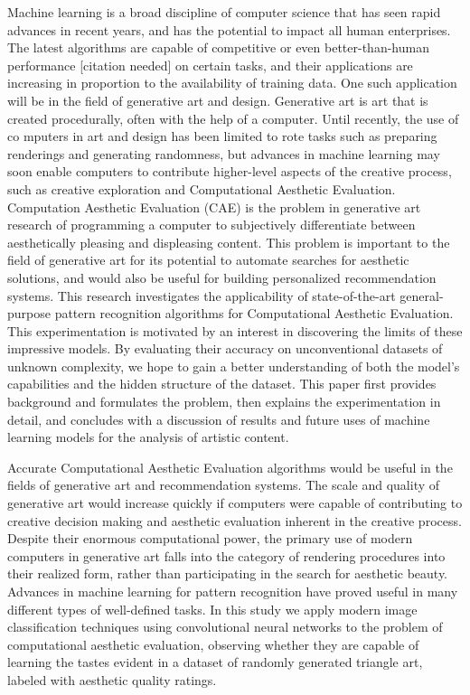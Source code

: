 \documentclass[midd]{thesis}
\begin{document}
Machine learning is a broad discipline of computer science that has seen rapid advances in recent years, and has the potential to impact all human enterprises. The latest algorithms are capable of competitive or even better-than-human performance [citation needed] on certain tasks, and their applications are increasing in proportion to the availability of training data. One such application will be in the field of generative art and design. Generative art is art that is created procedurally, often with the help of a computer. Until recently, the use of co mputers in art and design has been limited to rote tasks such as preparing renderings and generating randomness, but advances in machine learning may soon enable computers to contribute higher-level aspects of the creative process, such as creative exploration and Computational Aesthetic Evaluation. Computation Aesthetic Evaluation (CAE) is the problem in generative art research of programming a computer to subjectively differentiate between aesthetically pleasing and displeasing content. This problem is important to the field of generative art for its potential to automate searches for aesthetic solutions, and would also be useful for building personalized recommendation systems. This research investigates the applicability of state-of-the-art general-purpose pattern recognition algorithms for Computational Aesthetic Evaluation. This experimentation is motivated by an interest in discovering the limits of these impressive models. By evaluating their accuracy on unconventional datasets of unknown complexity, we hope to gain a better understanding of both the model's capabilities and the hidden structure of the dataset. This paper first provides background and formulates the problem, then explains the experimentation in detail, and concludes with a discussion of results and future uses of machine learning models for the analysis of artistic content.


Accurate Computational Aesthetic Evaluation algorithms would be useful in the fields of generative art and recommendation systems. The scale and quality of generative art would increase quickly if computers were capable of contributing to creative decision making and aesthetic evaluation inherent in the creative process. Despite their enormous computational power, the primary use of modern computers in generative art falls into the category of rendering procedures into their realized form, rather than participating in the search for aesthetic beauty. Advances in machine learning for pattern recognition have proved useful in many different types of well-defined tasks. In this study we apply modern image classification techniques using convolutional neural networks to the problem of computational aesthetic evaluation, observing whether they are capable of learning the tastes evident in a dataset of randomly generated triangle art, labeled with aesthetic quality ratings.
\end{document}
